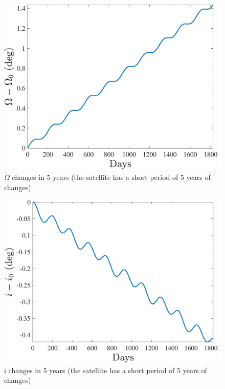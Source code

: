\begin{figure}[H]
    \caption{$\Omega$ changes in 5 years (the satellite has a short period of 5 years of changes)}
    \centering
    \includegraphics[width=12cm]{../Figure/Q2/Omega_fig}
\end{figure}

\begin{figure}[H]
    \caption{i changes in 5 years (the satellite has a short period of 5 years of changes)}
    \centering
    \includegraphics[width=12cm]{../Figure/Q2/i_fig}
\end{figure}

